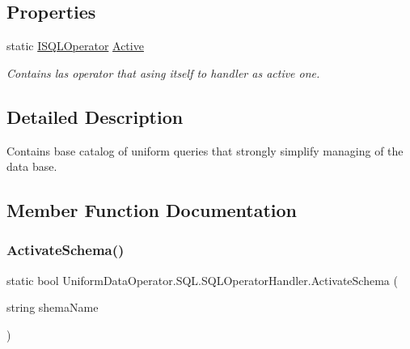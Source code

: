 \subsection*{Properties}
\begin{DoxyCompactItemize}
\item 
static \mbox{\hyperlink{interface_uniform_data_operator_1_1_s_q_l_1_1_i_s_q_l_operator}{I\+S\+Q\+L\+Operator}} \mbox{\hyperlink{class_uniform_data_operator_1_1_s_q_l_1_1_s_q_l_operator_handler_a0352c7146abccf0b231bf8bd83cd40c0}{Active}}
\begin{DoxyCompactList}\small\item\em Contains las operator that asing itself to handler as active one. \end{DoxyCompactList}\end{DoxyCompactItemize}


\subsection{Detailed Description}
Contains base catalog of uniform queries that strongly simplify managing of the data base. 



\subsection{Member Function Documentation}
\mbox{\label{class_uniform_data_operator_1_1_s_q_l_1_1_s_q_l_operator_handler_a328f3133fc68bad4a27e0f91ab48a38f}} 
\subsubsection{\texorpdfstring{Activate\+Schema()}{ActivateSchema()}}
{\footnotesize\ttfamily static bool Uniform\+Data\+Operator.\+S\+Q\+L.\+S\+Q\+L\+Operator\+Handler.\+Activate\+Schema (\begin{DoxyParamCaption}\item[{string}]{shema\+Name }\end{DoxyParamCaption})\hspace{0.3cm}{\ttfamily [static]}}



